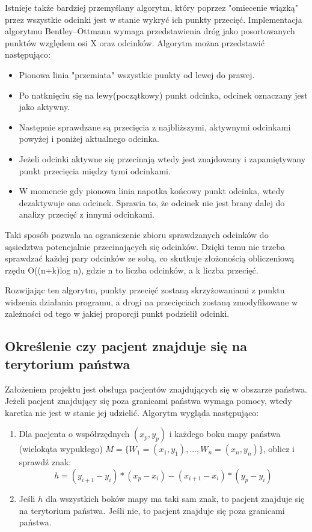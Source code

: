 \documentclass[10pt,a4paper]{article}
\begin{document}
Istnieje także bardziej przemyślany algorytm, który poprzez "omiecenie wiązką" przez wszystkie odcinki jest w stanie wykryć ich punkty przecięć.
Implementacja algorytmu Bentley–Ottmann wymaga przedstawienia dróg jako posortowanych punktów względem osi X oraz odcinków. Algorytm można przedstawić następująco:
\begin{itemize}
    \item Pionowa linia "przemiata" wszystkie punkty od lewej do prawej.
    \item Po natknięciu się na lewy(początkowy) punkt odcinka, odcinek oznaczany jest jako aktywny.
    \item Następnie sprawdzane są przecięcia z najbliższymi, aktywnymi odcinkami powyżej i poniżej aktualnego odcinka.
    \item Jeżeli odcinki aktywne się przecinają wtedy jest znajdowany i zapamiętywany punkt przecięcia między tymi odcinkami.
    \item W momencie gdy pionowa linia napotka końcowy punkt odcinka, wtedy dezaktywuje ona odcinek. Sprawia to, że odcinek nie jest brany dalej do analizy przecięć z innymi odcinkami.
\end{itemize}
Taki sposób pozwala na ograniczenie zbioru sprawdzanych odcinków do sąsiedztwa potencjalnie przecinających się odcinków.
Dzięki temu nie trzeba sprawdzać każdej pary odcinków ze sobą, co skutkuje złożonością obliczeniową rzędu O((n+k)log n), gdzie n to liczba odcinków, a k liczba przecięć.

Rozwijając ten algorytm, punkty przecięć zostaną skrzyżowaniami z punktu widzenia działania programu, a drogi na przecięciach zostaną zmodyfikowane w zależności od tego w jakiej proporcji punkt podzielił odcinki.


\subsection{Określenie czy pacjent znajduje się na terytorium państwa}

Założeniem projektu jest obsługa pacjentów znajdujących się w obszarze państwa.
Jeżeli pacjent znajdujący się poza granicami państwa wymaga pomocy, wtedy karetka nie jest w stanie jej udzielić.
Algorytm wygląda następująco:

\begin{enumerate}
    \item Dla pacjenta o współrzędnych $(x_p,y_p)$ i każdego boku mapy państwa (wielokąta wypukłego) $M=\{W_1=(x_1,y_1), ..., W_n=(x_n,y_n)\}$, oblicz i sprawdź znak:
    $$h=(y_{i+1}-y_i)*(x_p-x_i)-(x_{i+1}-x_i)*(y_p-y_i)$$
    \item Jeśli $h$ dla wszystkich boków mapy ma taki sam znak, to pacjent znajduje się na terytorium państwa. Jeśli nie, to pacjent znajduje się poza granicami państwa.
\end{enumerate}
\end{document}
